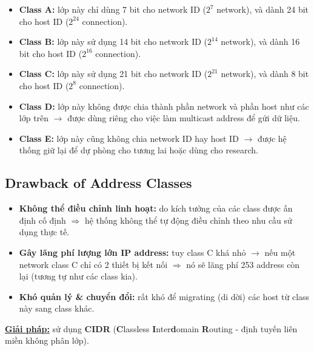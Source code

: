 \begin{itemize}
    \item \textbf{Class A:} lớp này chỉ dùng 7 bit cho network ID ($2^7$ network), và dành 24 bit cho host ID ($2^{24}$ connection).
    \item \textbf{Class B:} lớp này sử dụng 14 bit cho network ID ($2^{14}$ network), và dành 16 bit cho host ID ($2^{16}$ connection).
    \item \textbf{Class C:} lớp này sử dụng 21 bit cho network ID ($2^{21}$ network), và dành 8 bit cho host ID ($2^{8}$ connection).
    \item \textbf{Class D:} lớp này không được chia thành phần network và phần host như các lớp trên $\rightarrow$ được dùng riêng cho việc làm multicast address để gửi dữ liệu.
    \item \textbf{Class E:} lớp này cũng không chia network ID hay host ID $\rightarrow$ được hệ thống giữ lại để dự phòng cho tương lai hoặc dùng cho research.
\end{itemize}
\medskip


\subsection{Drawback of Address Classes}

\begin{itemize}
    \item \textbf{Không thể điều chỉnh linh hoạt:} do kích tưởng của các class được ấn định cố định $\Rightarrow$ hệ thống không thể tự động điều chỉnh theo nhu cầu sử dụng thực tế.
    \item \textbf{Gây lãng phí lượng lớn IP address:} tuy class C khá nhỏ $\rightarrow$ nếu một network class C chỉ có 2 thiết bị kết nối $\Rightarrow$ nó sẽ lãng phí 253 address còn lại (tương tự như các class kia).
    \item \textbf{Khó quản lý \& chuyển đổi:} rất khó để migrating (di dời) các host từ class này sang class khác.
\end{itemize}
\medskip

\noindent
\textbf{\underline{Giải pháp:}} sử dụng \textbf{CIDR} (\textbf{C}lassless \textbf{I}nter\textbf{d}omain \textbf{R}outing - định tuyến liên miền không phân lớp).


